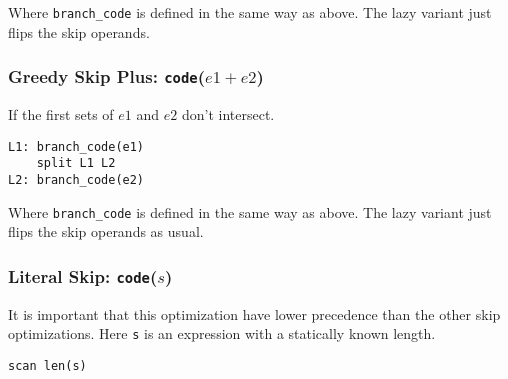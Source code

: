 Where \verb'branch_code' is defined in the same way as above.
The lazy variant just flips the skip operands.

\subsubsection{Greedy Skip Plus: {\tt code}($e1+e2$)}

If the first sets of $e1$ and $e2$ don't intersect.

\begin{verbatim}
L1: branch_code(e1)
    split L1 L2
L2: branch_code(e2)
\end{verbatim}

Where \verb'branch_code' is defined in the same way as above.
The lazy variant just flips the skip operands as usual.

\subsubsection{Literal Skip: {\tt code}($s$)}

It is important that this optimization have lower precedence
than the other skip optimizations. Here \verb's' is an
expression with a statically known length.

\begin{verbatim}
scan len(s)
\end{verbatim}
